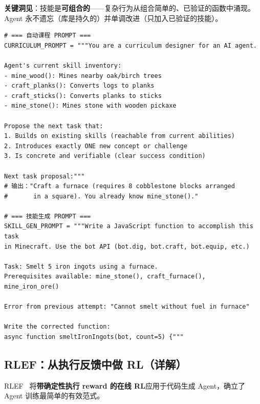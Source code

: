 \textbf{关键洞见}：技能是\textbf{可组合的}——复杂行为从组合简单的、已验证的函数中涌现。Agent 永不遗忘（库是持久的）并单调改进（只加入已验证的技能）。

\begin{examplebox}
\begin{lstlisting}[style=pythonstyle]
# === 自动课程 PROMPT ===
CURRICULUM_PROMPT = """You are a curriculum designer for an AI agent.

Agent's current skill inventory:
- mine_wood(): Mines nearby oak/birch trees
- craft_planks(): Converts logs to planks
- craft_sticks(): Converts planks to sticks
- mine_stone(): Mines stone with wooden pickaxe

Propose the next task that:
1. Builds on existing skills (reachable from current abilities)
2. Introduces exactly ONE new concept or challenge
3. Is concrete and verifiable (clear success condition)

Next task proposal:"""
# 输出："Craft a furnace (requires 8 cobblestone blocks arranged
#       in a square). You already know mine_stone()."

# === 技能生成 PROMPT ===
SKILL_GEN_PROMPT = """Write a JavaScript function to accomplish this task
in Minecraft. Use the bot API (bot.dig, bot.craft, bot.equip, etc.)

Task: Smelt 5 iron ingots using a furnace.
Prerequisites available: mine_stone(), craft_furnace(), mine_iron_ore()

Error from previous attempt: "Cannot smelt without fuel in furnace"

Write the corrected function:
async function smeltIronIngots(bot, count=5) {"""
\end{lstlisting}
\end{examplebox}

\subsection{RLEF：从执行反馈中做 RL（详解）}
\label{rlef-rl-from-execution-feedback-detailed}

RLEF~\cite{le2024rlef} 将\textbf{带确定性执行 reward 的在线 RL}应用于代码生成 Agent，确立了 Agent 训练最简单的有效范式。

